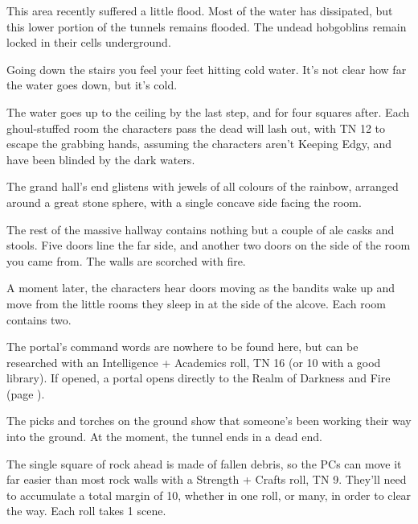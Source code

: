 \begin{multicols}{2}

This area recently suffered a little flood.  Most of the water has dissipated, but this lower portion of the tunnels remains flooded.  The undead hobgoblins remain locked in their cells underground.


\begin{boxtext}
	Going down the stairs you feel your feet hitting cold water.  It's not clear how far the water goes down, but it's cold.
\end{boxtext}

The water goes up to the ceiling by the last step, and for four squares after.  Each ghoul-stuffed room the characters pass the dead will lash out, with TN 12 to escape the grabbing hands, assuming the characters aren't Keeping Edgy, and have been blinded by the dark waters.



\begin{boxtext}
	The grand hall's end glistens with jewels of all colours of the rainbow, arranged around a great stone sphere, with a single concave side facing the room.

	The rest of the massive hallway contains nothing but a couple of ale casks and stools.  Five doors line the far side, and another two doors on the side of the room you came from.  The walls are scorched with fire.

\end{boxtext}

A moment later, the characters hear doors moving as the bandits wake up and move from the little rooms they sleep in at the side of the alcove.  Each room contains two.

The portal's command words are nowhere to be found here, but can be researched with an Intelligence + Academics roll, TN 16 (or 10 with a good library).  If opened, a portal opens directly to the Realm of Darkness and Fire (page \pageref{darknessandfire}).


\sewerking


\begin{boxtext}
	The picks and torches on the ground show that someone's been working their way into the ground.  At the moment, the tunnel ends in a dead end.
\end{boxtext}
 
The single square of rock ahead is made of fallen debris, so the PCs can move it far easier than most rock walls with a Strength + Crafts roll, TN 9.  They'll need to accumulate a total margin of 10, whether in one roll, or many, in order to clear the way.  Each roll takes 1 scene.


\end{multicols}
